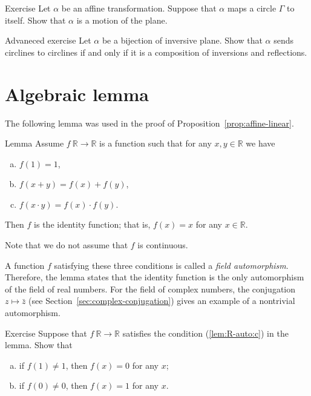 \begin{thm}{Exercise}\label{ex:preserved-circle}
Let $\alpha$ be an affine transformation.
Suppose that $\alpha$ maps a circle $\Gamma$ to itself.
Show that $\alpha$ is a motion of the plane.
\end{thm}


\begin{thm}{Advaneced exercise}\label{ex:inversions-inversive}
Let $\alpha$ be a bijection of inversive plane.
Show that $\alpha$ sends circlines to circlines if and only if it is a composition of inversions and reflections.
\end{thm}



\section{Algebraic lemma}

The following lemma was used in the proof of Proposition~\ref{prop:affine-linear}.

\begin{thm}{Lemma}\label{lem:R-auto}
Assume $f\:\mathbb{R}\to\mathbb{R}$ is a function such that for any $x,y\in\mathbb{R}$ we have
\begin{enumerate}[(a)]
\item\label{lem:R-auto:a} $f(1)=1$,
\item\label{lem:R-auto:b} $f(x+y)=f(x)+f(y)$,
\item\label{lem:R-auto:c} $f(x\cdot y)=f(x)\cdot f(y)$.
\end{enumerate}

Then $f$ is the identity function; that is,
$f(x)=x$ for any $x\in \mathbb{R}$.
\end{thm}

Note that we do not assume that $f$ is continuous.

A function $f$ satisfying these three conditions
is called a \emph{field automorphism}.
Therefore, the lemma states that the identity function is the only automorphism of the field of real numbers.
For the field of complex numbers, the conjugation $z\mapsto\bar z$ (see Section~\ref{sec:complex-conjugation}) gives an example of a nontrivial automorphism.

\begin{thm}{Exercise}\label{ex:f(1)=1}
Suppose that $f\:\mathbb{R}\to\mathbb{R}$ satisfies the condition (\ref{lem:R-auto:c}) in the lemma.
Show that 
\begin{enumerate}[(a)]
 \item if $f(1)\ne 1$, then $f(x)=0$ for any $x$;
  \item if $f(0)\ne 0$, then $f(x)=1$ for any $x$.
\end{enumerate}
\end{thm}


